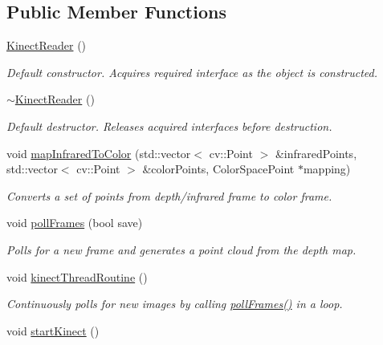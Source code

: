 \subsection*{Public Member Functions}
\begin{DoxyCompactItemize}
\item 
\hyperlink{classpersonal_robotics_1_1_kinect_reader_a69d11390fa49438a1a902c224b7e3b5c}{Kinect\+Reader} ()
\begin{DoxyCompactList}\small\item\em Default constructor. Acquires required interface as the object is constructed. \end{DoxyCompactList}\item 
\hyperlink{classpersonal_robotics_1_1_kinect_reader_a66a9f845a60a1bed3ccf6c7883a47a9c}{$\sim$\+Kinect\+Reader} ()
\begin{DoxyCompactList}\small\item\em Default destructor. Releases acquired interfaces before destruction. \end{DoxyCompactList}\item 
void \hyperlink{classpersonal_robotics_1_1_kinect_reader_a503882cdd6ad197882c0e8c4eab14664}{map\+Infrared\+To\+Color} (std\+::vector$<$ cv\+::\+Point $>$ \&infrared\+Points, std\+::vector$<$ cv\+::\+Point $>$ \&color\+Points, Color\+Space\+Point $\ast$mapping)
\begin{DoxyCompactList}\small\item\em Converts a set of points from depth/infrared frame to color frame. \end{DoxyCompactList}\item 
void \hyperlink{classpersonal_robotics_1_1_kinect_reader_ab4e331adf22016e45341a0a121b31ad7}{poll\+Frames} (bool save)
\begin{DoxyCompactList}\small\item\em Polls for a new frame and generates a point cloud from the depth map. \end{DoxyCompactList}\item 
\hypertarget{classpersonal_robotics_1_1_kinect_reader_a9263a03547aa8f9d401d3e2ad34f5e4f}{}void \hyperlink{classpersonal_robotics_1_1_kinect_reader_a9263a03547aa8f9d401d3e2ad34f5e4f}{kinect\+Thread\+Routine} ()\label{classpersonal_robotics_1_1_kinect_reader_a9263a03547aa8f9d401d3e2ad34f5e4f}

\begin{DoxyCompactList}\small\item\em Continuously polls for new images by calling \hyperlink{classpersonal_robotics_1_1_kinect_reader_ab4e331adf22016e45341a0a121b31ad7}{poll\+Frames()} in a loop. \end{DoxyCompactList}\item 
\hypertarget{classpersonal_robotics_1_1_kinect_reader_adc75d3fe175de9d6fea8b48ae90de06c}{}void \hyperlink{classpersonal_robotics_1_1_kinect_reader_adc75d3fe175de9d6fea8b48ae90de06c}{start\+Kinect} ()\label{classpersonal_robotics_1_1_kinect_reader_adc75d3fe175de9d6fea8b48ae90de06c}


\end{DoxyCompactItemize}
